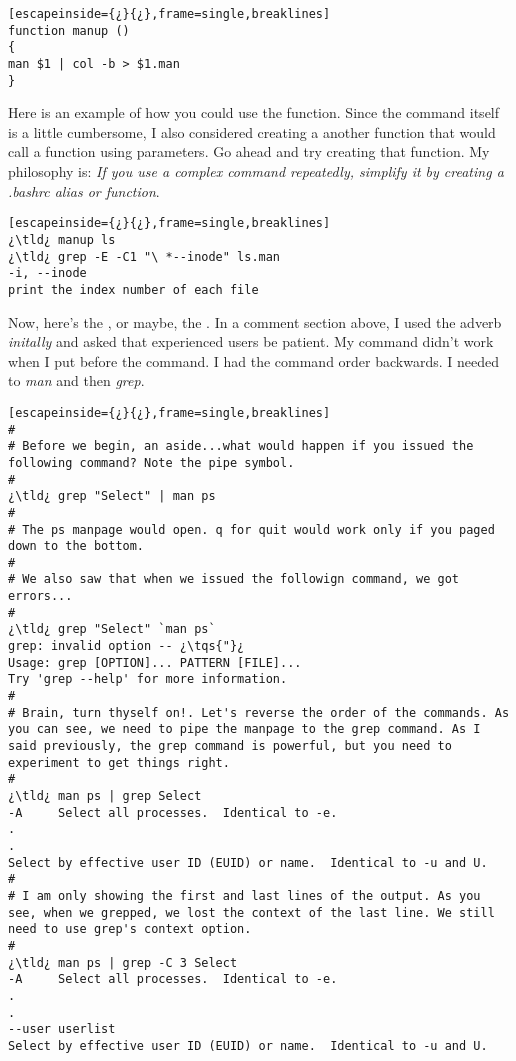 \begin{lstlisting}[escapeinside={¿}{¿},frame=single,breaklines]
function manup ()
{
man $1 | col -b > $1.man
}
\end{lstlisting}

Here is an example of how you could use the function. Since the command itself is a little cumbersome, I also considered creating a another function that would call a function using parameters. Go ahead and try creating that function. My philosophy is: \textit{If you use a complex command repeatedly, simplify it by creating a \emph{.bashrc} alias or function}.

\begin{lstlisting}[escapeinside={¿}{¿},frame=single,breaklines]
¿\tld¿ manup ls
¿\tld¿ grep -E -C1 "\ *--inode" ls.man
-i, --inode
print the index number of each file
\end{lstlisting}

Now, here's the , or maybe, the . In a comment section above, I used the adverb \emph{initally} and asked that experienced users be patient. My command didn't work when I put  before the command. I had the command order backwards. I needed to \emph{man} and then \emph{grep}.

\begin{lstlisting}[escapeinside={¿}{¿},frame=single,breaklines]
#
# Before we begin, an aside...what would happen if you issued the following command? Note the pipe symbol.
#
¿\tld¿ grep "Select" | man ps
#
# The ps manpage would open. q for quit would work only if you paged down to the bottom.
#
# We also saw that when we issued the followign command, we got errors...
#
¿\tld¿ grep "Select" `man ps`
grep: invalid option -- ¿\tqs{"}¿
Usage: grep [OPTION]... PATTERN [FILE]...
Try 'grep --help' for more information.
# 
# Brain, turn thyself on!. Let's reverse the order of the commands. As you can see, we need to pipe the manpage to the grep command. As I said previously, the grep command is powerful, but you need to experiment to get things right.
#
¿\tld¿ man ps | grep Select
-A     Select all processes.  Identical to -e.
.
.
Select by effective user ID (EUID) or name.  Identical to -u and U.
#
# I am only showing the first and last lines of the output. As you see, when we grepped, we lost the context of the last line. We still need to use grep's context option.
#
¿\tld¿ man ps | grep -C 3 Select
-A     Select all processes.  Identical to -e.
.
.
--user userlist
Select by effective user ID (EUID) or name.  Identical to -u and U.
\end{lstlisting}

